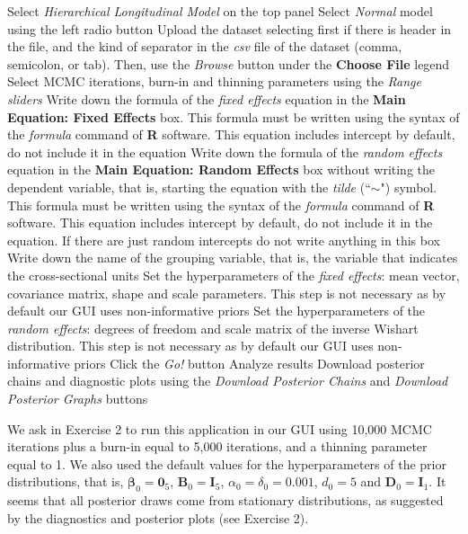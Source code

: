 \begin{algorithm}[h!]
	\caption{Hierarchical longitudinal normal models}\label{alg:HLN}
	\begin{algorithmic}[1]  		 			
		\State Select \textit{Hierarchical Longitudinal Model} on the top panel
		\State Select \textit{Normal} model using the left radio button
		\State Upload the dataset selecting first if there is header in the file, and the kind of separator in the \textit{csv} file of the dataset (comma, semicolon, or tab). Then, use the \textit{Browse} button under the \textbf{Choose File} legend
		\State Select MCMC iterations, burn-in and thinning parameters using the \textit{Range sliders}
		\State Write down the formula of the \textit{fixed effects} equation in the \textbf{Main Equation: Fixed Effects} box. This formula must be written using the syntax of the \textit{formula} command of \textbf{R} software. This equation includes intercept by default, do not include it in the equation
		\State Write down the formula of the \textit{random effects} equation in the \textbf{Main Equation: Random Effects} box without writing the dependent variable, that is, starting the equation with the \textit{tilde} (``$\sim$") symbol. This formula must be written using the syntax of the \textit{formula} command of \textbf{R} software. This equation includes intercept by default, do not include it in the equation. If there are just random intercepts do not write anything in this box
		\State Write down the name of the grouping variable, that is, the variable that indicates the cross-sectional units 
		\State Set the hyperparameters of the \textit{fixed effects}: mean vector, covariance matrix, shape and scale parameters. This step is not necessary as by default our GUI uses non-informative priors
		\State Set the hyperparameters of the \textit{random effects}: degrees of freedom and scale matrix of the inverse Wishart distribution. This step is not necessary as by default our GUI uses non-informative priors
		\State Click the \textit{Go!} button
		\State Analyze results
		\State Download posterior chains and diagnostic plots using the \textit{Download Posterior Chains} and \textit{Download Posterior Graphs} buttons
	\end{algorithmic} 
\end{algorithm}

We ask in Exercise 2 to run this application in our GUI using 10,000 MCMC iterations plus a burn-in equal to 5,000 iterations, and a thinning parameter equal to 1. We also used the default values for the hyperparameters of the prior distributions, that is, $\bm{\beta}_0=\bm{0}_5$, $\bm{B}_0=\bm{I}_5$, $\alpha_0=\delta_0=0.001$, $d_0=5$ and $\bm{D}_0=\bm{I}_1$. It seems that all posterior draws come from stationary distributions, as suggested by the diagnostics and posterior plots (see Exercise 2).

